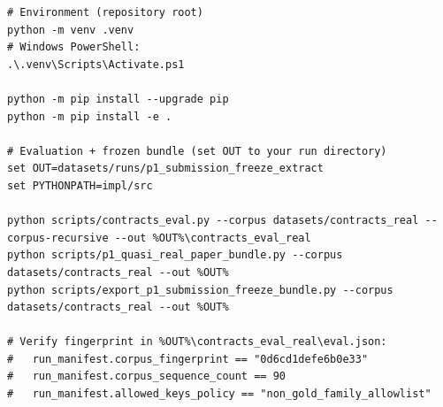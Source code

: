 
\begin{verbatim}
# Environment (repository root)
python -m venv .venv
# Windows PowerShell:
.\.venv\Scripts\Activate.ps1

python -m pip install --upgrade pip
python -m pip install -e .

# Evaluation + frozen bundle (set OUT to your run directory)
set OUT=datasets/runs/p1_submission_freeze_extract
set PYTHONPATH=impl/src

python scripts/contracts_eval.py --corpus datasets/contracts_real --corpus-recursive --out %OUT%\contracts_eval_real
python scripts/p1_quasi_real_paper_bundle.py --corpus datasets/contracts_real --out %OUT%
python scripts/export_p1_submission_freeze_bundle.py --corpus datasets/contracts_real --out %OUT%

# Verify fingerprint in %OUT%\contracts_eval_real\eval.json:
#   run_manifest.corpus_fingerprint == "0d6cd1defe6b0e33"
#   run_manifest.corpus_sequence_count == 90
#   run_manifest.allowed_keys_policy == "non_gold_family_allowlist"
\end{verbatim}
